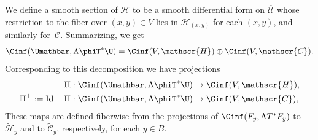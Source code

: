 We define a smooth section of $\mathscr{H}$ to be a smooth differential form on $\overline{\mathscr{U}}$ whose restric\-tion to the fiber over $(x,y)\in V$ lies in $\mathscr{H}_{(x,y)}$ for each $(x,y)$, and similarly for~$\mathscr{C}$. Summarizing, we get
\begin{equation}
\label{eqn:Cinf decomp}
\Cinf(\Umathbar,\Lambda \phiT^*\U) = \Cinf(V, \mathscr{H}) \oplus \Cinf(V,\mathscr{C}).
\end{equation}
Corresponding to this decomposition we have projections
\begin{equation}\label{projections-def}
\begin{split}
\Pi: \Cinf(\Umathbar,\Lambda \phiT^*\U) &\to \Cinf(V, \mathscr{H}), \\
\Pi^{\perp} := \text{Id} - \Pi: \Cinf(\Umathbar,\Lambda \phiT^*\U) &\to \Cinf(V,\mathscr{C}),
\end{split}
\end{equation}
These maps are defined fiberwise from the projections of $\Cinf(F_y,\Lambda T^*F_y)$ to $\widetilde{\mathscr{H}}_y$ and to $\widetilde{\mathscr{C}}_y$, respectively, for each $y \in B$.

